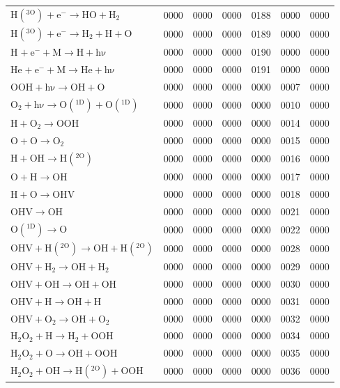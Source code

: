 \begin{longtable}{lrrrrrr}
$\mathrm{H(^{3O})^{} + e^{-} \rightarrow HO + H_2}$ & 0000 & 0000 & 0000 & 0188 & 0000 & 0000 \\
$\mathrm{H(^{3O})^{} + e^{-} \rightarrow H_2 + H + O}$ & 0000 & 0000 & 0000 & 0189 & 0000 & 0000 \\
$\mathrm{H^{} + e^{-} + M \rightarrow H + h\nu}$ & 0000 & 0000 & 0000 & 0190 & 0000 & 0000 \\
$\mathrm{He^{} + e^{-} + M \rightarrow He + h\nu}$ & 0000 & 0000 & 0000 & 0191 & 0000 & 0000 \\
$\mathrm{OOH + h\nu \rightarrow OH + O}$ & 0000 & 0000 & 0000 & 0000 & 0007 & 0000 \\
$\mathrm{O_2 + h\nu \rightarrow O(^{1D}) + O(^{1D})}$ & 0000 & 0000 & 0000 & 0000 & 0010 & 0000 \\
$\mathrm{H + O_2 \rightarrow OOH}$ & 0000 & 0000 & 0000 & 0000 & 0014 & 0000 \\
$\mathrm{O + O \rightarrow O_2}$ & 0000 & 0000 & 0000 & 0000 & 0015 & 0000 \\
$\mathrm{H + OH \rightarrow H(^{2O})}$ & 0000 & 0000 & 0000 & 0000 & 0016 & 0000 \\
$\mathrm{O + H \rightarrow OH}$ & 0000 & 0000 & 0000 & 0000 & 0017 & 0000 \\
$\mathrm{H + O \rightarrow OHV}$ & 0000 & 0000 & 0000 & 0000 & 0018 & 0000 \\
$\mathrm{OHV \rightarrow OH}$ & 0000 & 0000 & 0000 & 0000 & 0021 & 0000 \\
$\mathrm{O(^{1D}) \rightarrow O}$ & 0000 & 0000 & 0000 & 0000 & 0022 & 0000 \\
$\mathrm{OHV + H(^{2O}) \rightarrow OH + H(^{2O})}$ & 0000 & 0000 & 0000 & 0000 & 0028 & 0000 \\
$\mathrm{OHV + H_2 \rightarrow OH + H_2}$ & 0000 & 0000 & 0000 & 0000 & 0029 & 0000 \\
$\mathrm{OHV + OH \rightarrow OH + OH}$ & 0000 & 0000 & 0000 & 0000 & 0030 & 0000 \\
$\mathrm{OHV + H \rightarrow OH + H}$ & 0000 & 0000 & 0000 & 0000 & 0031 & 0000 \\
$\mathrm{OHV + O_2 \rightarrow OH + O_2}$ & 0000 & 0000 & 0000 & 0000 & 0032 & 0000 \\
$\mathrm{H_2O_2 + H \rightarrow H_2 + OOH}$ & 0000 & 0000 & 0000 & 0000 & 0034 & 0000 \\
$\mathrm{H_2O_2 + O \rightarrow OH + OOH}$ & 0000 & 0000 & 0000 & 0000 & 0035 & 0000 \\
$\mathrm{H_2O_2 + OH \rightarrow H(^{2O}) + OOH}$ & 0000 & 0000 & 0000 & 0000 & 0036 & 0000 \\

\end{longtable}
